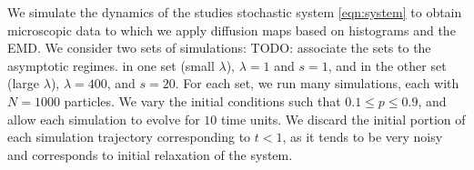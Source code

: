 \documentclass[prl, reprint, final, showkeys]{revtex4-1}
\begin{document}



We simulate the dynamics of the studies stochastic system \eqref{eqn:system} to obtain microscopic data to which we apply diffusion maps based on histograms and the EMD.
%
We consider two sets of simulations: TODO: associate the sets to the asymptotic regimes.
in one set (small $\lambda$), $\lambda = 1$ and $s=1$, and in the other set (large $\lambda$), $\lambda = 400$, and $s=20$.
%
For each set, we run many simulations, each with $N=1000$ particles.
%
We vary the initial conditions such that $0.1 \le p  \le 0.9$, and allow each simulation to evolve for $10$ time units.
%
We discard the initial portion of each simulation trajectory corresponding to $t < 1$, as it tends to be very noisy and corresponds to initial relaxation of the system.

\end{document}
